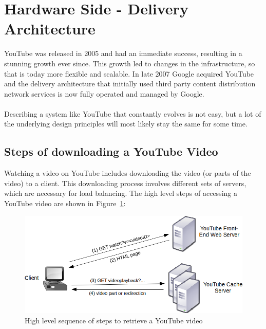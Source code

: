 \section{Hardware Side - Delivery Architecture} 

YouTube was released in 2005 and had an immediate success, resulting in a stunning growth ever since. This growth led to changes in the infrastructure, so that is today more flexible and scalable. In late 2007 Google acquired YouTube and the delivery architecture that initially used third party content distribution network services is now fully operated and managed by Google.
\\
\\
Describing a system like YouTube that constantly evolves is not easy, but a lot of the underlying design principles will most likely stay the same for some time.

\subsection{Steps of downloading a YouTube Video}

Watching a video on YouTube includes downloading the video (or parts of the video) to a client. This downloading process involves different sets of servers, which are necessary for load balancing. The high level steps of accessing a YouTube video are shown in Figure~\ref{fig:video_retrieval}:

\begin{figure}[htbp]
  \begin{center}
    \includegraphics[width=\textwidth]{pictures/video_retrieval.png}
    \caption{High level sequence of steps to retrieve a YouTube video}
    \label{fig:video_retrieval}
  \end{center}
\end{figure}

